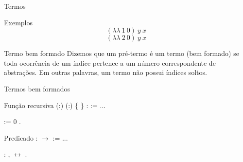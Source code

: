 \documentclass{beamer}
\begin{document}

\begin{frame}{Termos}

\begin{block}{Exemplos}
    \[ (\lambda \lambda\ 1\ 0)\ y\ x \] 
    \pause
    \[ (\lambda \lambda\ 2\ 0)\ y\ x \] 
    
\end{block}

\pause

\begin{block}{Termo bem formado}
    Dizemos que um pré-termo é um termo (bem formado) se toda ocorrência de
    um índice pertence a um número correspondente de abstrações. Em outras
    palavras, um termo não possui índices soltos.
\end{block}

\end{frame}


\begin{frame}{Termos bem formados}

\begin{block}{Função recursiva}
  (:)
(:) \{ \} :
 := ...\coqdoceol

   :=  0 .
\end{block}

\begin{block}{Predicado}
\coqdocnoindent
{}  :
 \ensuremath{\rightarrow}
 := ...\coqdoceol
\end{block}

\bigskip
{}  : \coqdockw{\ensuremath{\forall}}
,   \ensuremath{\leftrightarrow}
 .\coqdoceol
\bigskip
    
\end{frame}

\end{document}
